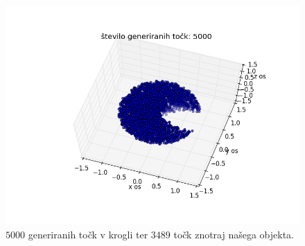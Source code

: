 \documentclass[slovene,11pt,a4paper]{article}
\numberwithin{equation}{section} %
\numberwithin{figure}{section} %
\numberwithin{table}{section} %
\begin{document}
\begin{figure}[h]
\begin{center}

\includegraphics[scale=0.7]{slike/prva_objekt.png}

\caption{$5000$ generiranih točk v krogli ter  $3489$ točk znotraj našega objekta.}
\end{center}
\end{figure}
\end{document}

